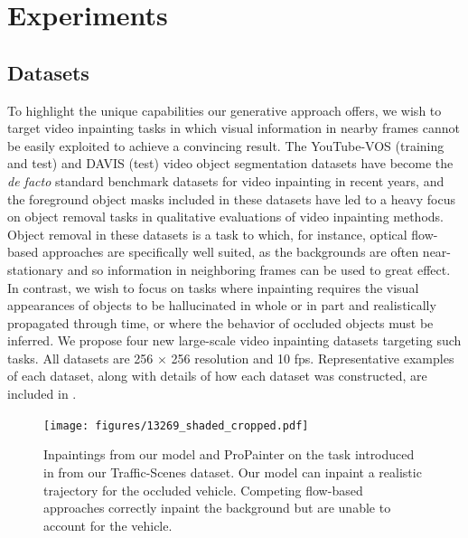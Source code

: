 \chapter{Experiments}
\section{Datasets}
To highlight the unique capabilities our generative approach offers, we wish to target video inpainting tasks in which visual information in nearby frames cannot be easily exploited to achieve a convincing result. The YouTube-VOS \citep{youtubevos1} (training and test) and DAVIS \citep{davis} (test) video object segmentation datasets have become the \emph{de facto} standard benchmark datasets for video inpainting in recent years, and the foreground object masks included in these datasets have led to a heavy focus on object removal tasks in qualitative evaluations of video inpainting methods. Object removal in these datasets is a task to which, for instance, optical flow-based approaches are specifically well suited, as the backgrounds are often near-stationary and so information in neighboring frames can be used to great effect. In contrast, we wish to focus on tasks where inpainting requires the visual appearances of objects to be hallucinated in whole or in part and realistically propagated through time, or where the behavior of occluded objects must be inferred. We propose four new large-scale video inpainting datasets targeting such tasks. All datasets are 256 $\times$ 256 resolution and 10 fps. Representative examples of each dataset, along with details of how each dataset was constructed, are included in .
\begin{figure}[t]
\centering
\texttt{[image: figures/13269\_shaded\_cropped.pdf]}
\caption[Inpaintings from our model and ProPainter on the task introduced in  from our Traffic-Scenes dataset.]{Inpaintings from our model and ProPainter on the task introduced in  from our Traffic-Scenes dataset. Our model can inpaint a realistic trajectory for the occluded vehicle. Competing flow-based approaches correctly inpaint the background but are unable to account for the vehicle.}
\label{fig:traffic-scenes}
\end{figure}
